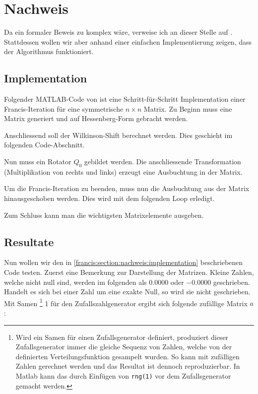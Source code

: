\section{Nachweis\label{francis:section:nachweis}}

Da ein formaler Beweis zu komplex wäre, verweise ich an dieser Stelle auf \cite{francis:watkins_book}.
Stattdessen wollen wir aber anhand einer einfachen Implementierung zeigen, dass der Algorithmus funktioniert.

\subsection{Implementation\label{francis:section:nachweis:implementation}}
Folgender MATLAB-Code von \cite{francis:watkins_book} ist eine Schritt-für-Schritt Implementation einer Francis-Iteration für eine symmetrische $n \times n$ Matrix.
Zu Beginn muss eine Matrix generiert und auf Hessenberg-Form gebracht werden.

Anschliessend soll der Wilkinson-Shift berechnet werden.
Dies geschieht im folgenden Code-Abschnitt.

Nun muss ein Rotator $Q_0$ gebildet werden.
Die anschliessende Transformation (Multiplikation von rechts und links) erzeugt eine Ausbuchtung in der Matrix.

Um die Francis-Iteration zu beenden, muss nun die Ausbuchtung aus der Matrix hinausgeschoben werden.
Dies wird mit dem folgenden Loop erledigt.

Zum Schluss kann man die wichtigsten Matrixelemente ausgeben.


\subsection{Resultate\label{francis:section:nachweis:resultate}}
Nun wollen wir den in \ref{francis:section:nachweis:implementation} beschriebenen Code testen.
Zuerst eine Bemerkung zur Darstellung der Matrizen. 
Kleine Zahlen, welche nicht null sind, werden im folgenden als $0.0000$
oder $-0.0000$ geschrieben.
Handelt es sich bei einer Zahl um eine exakte Null, so wird sie nicht geschrieben.
Mit Samen \footnote{Wird ein Samen für einen Zufallsgenerator definiert, produziert dieser Zufallsgenerator immer die gleiche Sequenz von Zahlen, welche von der definierten Verteilungsfunktion gesampelt wurden.
%
%
So kann mit zufälligen Zahlen gerechnet werden und das Resultat ist dennoch reproduzierbar.
In Matlab kann das durch Einfügen von \texttt{rng(1)} vor dem Zufallsgenerator gemacht werden.}
1 für den Zufallszahlgenerator ergibt sich folgende zufällige Matrix $a$:

